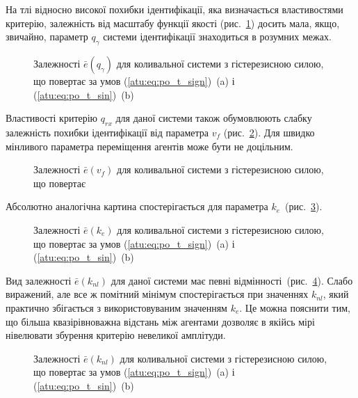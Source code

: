 На тлі відносно високої похибки ідентифікації, яка визначається
властивостями критерію, залежність від масштабу функції якості
(рис.~\ref{atu:f:vg_e_q_gamma}) досить мала, якщо, звичайно, параметр
$q_\gamma $ системи ідентифікації знаходиться в розумних межах.

\begin{figure}[htb!]
  \caption{Залежності $\bar{e}(q_\gamma)$ для коливальної системи з гістерезисною силою, що повертає за умов (\ref{atu:eq:po_t_sign})~(a) і (\ref{atu:eq:po_t_sin})~(b)}
\label{atu:f:vg_e_q_gamma}
\end{figure}

Властивості критерію
$q_{rx}$ для даної системи також обумовлюють слабку залежність
похибки ідентифікації від параметра
$v_f$ (рис.~\ref{atu:f:vg_e_v_f}).
Для швидко мінливого параметра переміщення агентів може бути не доцільним.

\begin{figure}[htb!]
  \caption{Залежності $\bar{e}(v_f)$ для коливальної системи з гістерезисною силою, що повертає}
\label{atu:f:vg_e_v_f}
\end{figure}

Абсолютно аналогічна картина спостерігається для параметра
$k_e$~(рис.~\ref{atu:f:vg_e_k_e}).

\begin{figure}[htb!]
  \caption{Залежності $\bar{e}(k_e)$ для коливальної системи з гістерезисною силою, що повертає за умов (\ref{atu:eq:po_t_sign})~(a) і (\ref{atu:eq:po_t_sin})~(b)}
\label{atu:f:vg_e_k_e}
\end{figure}

Вид залежності
$\bar{e} (k_{nl}) $ для даної системи має певні
відмінності~(рис.~\ref{atu:f:vg_e_k_nl}). Слабо виражений, але все ж
помітний мінімум спостерігається при значеннях
$k_{nl}$, який практично збігається з використовуваним значенням
$k_e$. Це можна пояснити тим, що більша квазірівноважна відстань
між агентами дозволяє в якійсь мірі нівелювати збурення
критерію невеликої амплітуди.

\begin{figure}[htb!]
  \caption{Залежності $\bar{e}(k_{nl})$ для коливальної системи з гістерезисною силою, що повертає за умов (\ref{atu:eq:po_t_sign})~(a) і (\ref{atu:eq:po_t_sin})~(b)}
\label{atu:f:vg_e_k_nl}
\end{figure}

